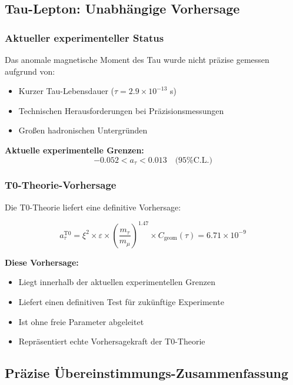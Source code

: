 \documentclass[12pt,a4paper]{article}
\numberwithin{equation}{section}
\newcommand{\xipar}{\xi}
\newcommand{\epsilonT}{\varepsilon}
\newcommand{\Cgeom}{C_{\text{geom}}}
\begin{document}
	\subsection{Tau-Lepton: Unabhängige Vorhersage}
	
	\subsubsection{Aktueller experimenteller Status}
	
	Das anomale magnetische Moment des Tau wurde nicht präzise gemessen aufgrund von:
	\begin{itemize}
		\item Kurzer Tau-Lebensdauer ($\tau = 2.9 \times 10^{-13}$ s)
		\item Technischen Herausforderungen bei Präzisionsmessungen
		\item Großen hadronischen Untergründen
	\end{itemize}
	
	\textbf{Aktuelle experimentelle Grenzen:}
	\begin{equation}
		-0.052 < a_\tau < 0.013 \quad \text{(95\% C.L.)}
		\label{eq:tau_experimental_bounds}
	\end{equation}
	
	\subsubsection{T0-Theorie-Vorhersage}
	
	Die T0-Theorie liefert eine definitive Vorhersage:
	
	\begin{equation}
		a_\tau^{\text{T0}} = \xipar^2 \times \epsilonT \times \left(\frac{m_\tau}{m_\mu}\right)^{1.47} \times \Cgeom(\tau) = 6.71 \times 10^{-9}
		\label{eq:tau_t0_prediction}
	\end{equation}
	
	\textbf{Diese Vorhersage:}
	\begin{itemize}
		\item Liegt innerhalb der aktuellen experimentellen Grenzen
		\item Liefert einen definitiven Test für zukünftige Experimente
		\item Ist ohne freie Parameter abgeleitet
		\item Repräsentiert echte Vorhersagekraft der T0-Theorie
	\end{itemize}
	
	\subsection{Präzise Übereinstimmungs-Zusammenfassung}
	
\end{document}
